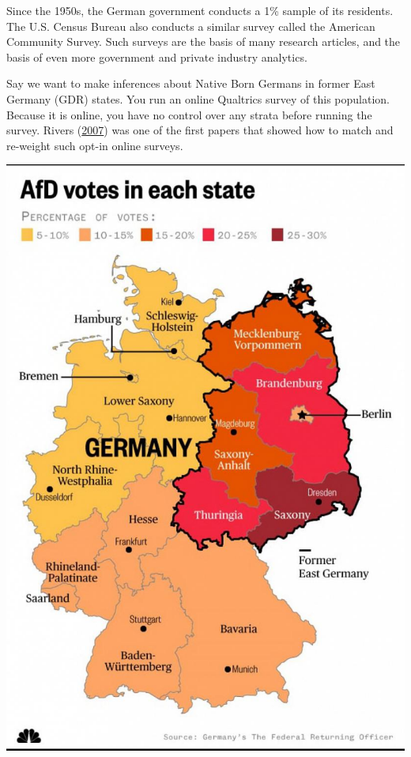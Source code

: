 \documentclass[10pt, letterpaper]{article}
\theoremstyle{mytheoremstyle}
\begin{document}
\begin{minipage}{0.75\linewidth}
\hspace{1em}Since the 1950s, the German government conducts a 1\% sample of its residents. The U.S. Census Bureau also conducts a similar survey called the American Community Survey. Such surveys are the basis of many research articles, and the basis of even more government and private industry analytics. 

\vspace{0.1in}

\hspace{1em}Say we want to make inferences about Native Born Germans in former East Germany (GDR) states.  You run an online Qualtrics survey of this population. Because it is online, you have no control over any strata before running the survey. Rivers (\href{https://citeseerx.ist.psu.edu/viewdoc/download?doi=10.1.1.468.9645&rep=rep1&type=pdf}{2007}) was one of the first papers that showed how to match and re-weight such opt-in online surveys. 
\end{minipage} %
\begin{minipage}{0.25\linewidth}
\includegraphics[width = \linewidth]{figs/afd-german-states.jpeg}
\end{minipage}
\end{document}
